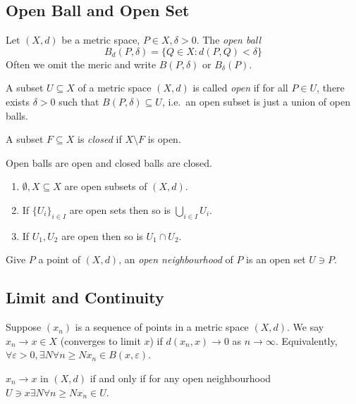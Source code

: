 \documentclass[a4paper]{article}
\begin{document}
\subsection{Open Ball and Open Set}

Let $(X,d)$ be a metric space, $P\in X, \delta > 0$. The \emph{open ball}
\[
  B_d(P,\delta) = \{Q\in X: d(P,Q) < \delta\}
\]
Often we omit the meric and write $B(P,\delta)$ or $B_\delta(P)$.

\begin{definition}
  A subset $U \subseteq X$ of a metric space $(X,d)$ is called \emph{open} if for all \(P \in U\), there exists \(\delta > 0\) such that $B(P,\delta) \subseteq U$, i.e.\ an open subset is just a union of open balls.
\end{definition}

\begin{definition}
  A subset $F\subseteq X$ is \emph{closed} if $X\setminus F$ is open.
\end{definition}

Open balls are open and closed balls are closed.

\begin{lemma}\leavevmode
  \begin{enumerate}
  \item $\emptyset, X \subseteq X$ are open subsets of $(X,d)$.
  \item If $\{U_i\}_{i\in I}$ are open sets then so is $\bigcup_{i\in I} U_i$.
    \item If $U_1, U_2$ are open then so is $U_1 \cap U_2$.
  \end{enumerate}
\end{lemma}

\begin{definition}
  Give $P$ a point of $(X,d)$, an \emph{open neighbourhood} of $P$ is an open set $U \ni P$.
\end{definition}

\subsection{Limit and Continuity}

Suppose $(x_n)$ is a sequence of points in a metric space $(X,d)$. We say $x_n \to x\in X$ (converges to limit $x$) if $d(x_n,x) \to 0$ as $n \to \infty$. Equivalently, $\forall \varepsilon>0, \exists N \forall n\geq N x_n \in B(x, \varepsilon)$.

\begin{remark}
  $x_n \to x$ in $(X,d)$ if and only if for any open neighbourhood $U \ni x \exists N \forall n\geq N x_n \in U$. 
\end{remark}
\end{document}

